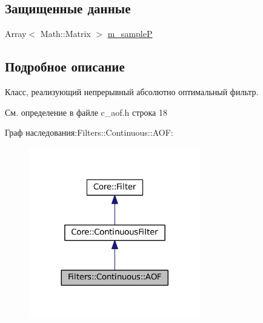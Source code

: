 \subsection*{Защищенные данные}
\begin{DoxyCompactItemize}
\item 
Array$<$ Math\+::\+Matrix $>$ \hyperlink{class_filters_1_1_continuous_1_1_a_o_f_a3cff90f7e12e677f04102f1717ef7a49}{m\+\_\+sampleP}
\end{DoxyCompactItemize}


\subsection{Подробное описание}
Класс, реализующий непрерывный абсолютно оптимальный фильтр. 

См. определение в файле c\+\_\+aof.\+h строка 18



Граф наследования\+:Filters\+:\+:Continuous\+:\+:A\+OF\+:
\nopagebreak
\begin{figure}[H]
\begin{center}
\leavevmode
\includegraphics[width=212pt]{class_filters_1_1_continuous_1_1_a_o_f__inherit__graph}
\end{center}
\end{figure}


